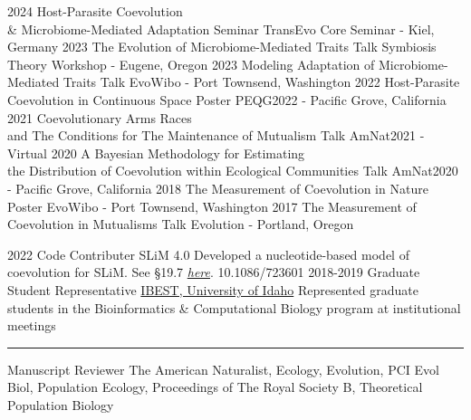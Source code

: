 \documentclass[9pt]{developercv} %
\begin{document}
\vspace{-10 pt}
\begin{preslist}
    \pres
    {2024}
    {Host-Parasite Coevolution\\ \& Microbiome-Mediated Adaptation}
    {Seminar}
    {TransEvo Core Seminar - Kiel, Germany}
    \pres
    {2023}
    {The Evolution of Microbiome-Mediated Traits}
    {Talk}
    {Symbiosis Theory Workshop - Eugene, Oregon}
    \pres
    {2023}
    {Modeling Adaptation of Microbiome-Mediated Traits}
    {Talk}
    {EvoWibo - Port Townsend, Washington}
    \pres
    {2022}
    {Host-Parasite Coevolution in Continuous Space}
    {Poster}
    {PEQG2022 - Pacific Grove, California}
    \pres
    {2021}
    {Coevolutionary Arms Races\\ and The Conditions for The Maintenance of Mutualism}
    {Talk}
    {AmNat2021 - Virtual}
    \pres
    {2020}
    {A Bayesian Methodology for Estimating\\ the Distribution of Coevolution within Ecological Communities}
    {Talk}
    {AmNat2020 - Pacific Grove, California}
    \pres
    {2018}
    {The Measurement of Coevolution in Nature}
    {Poster}
    {EvoWibo - Port Townsend, Washington}
    \pres
    {2017}
    {The Measurement of Coevolution in Mutualisms}
    {Talk}
    {Evolution - Portland, Oregon}
\end{preslist}

\vspace{-10 pt}
\begin{publist}
    \pub
    {2022}
    {Code Contributer}
    {SLiM 4.0}
    {Developed a nucleotide-based model of coevolution for SLiM. See §19.7 \href{https://github.com/MesserLab/SLiM/releases/download/v4.0.1/SLiM_Manual.pdf}{\emph{here}}.}
    {10.1086/723601}
    \entry
    {2018-2019}
    {Graduate Student Representative}
    {\href{https://www.iids.uidaho.edu/about.php}{IBEST, University of Idaho}}
    {Represented graduate students in the Bioinformatics \& Computational Biology program at institutional meetings}
    \entry
    {\rule{0.6cm}{0.1pt}}
    {Manuscript Reviewer}
    {}
    {The American Naturalist, Ecology, Evolution, PCI Evol Biol, Population Ecology, Proceedings of The Royal Society B, Theoretical Population Biology}
\end{publist}
\end{document}
